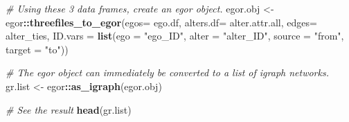 \documentclass[
]{book}
\newenvironment{Shaded}{\begin{snugshade}}{\end{snugshade}}
\newcommand{\AttributeTok}[1]{\textcolor[rgb]{0.13,0.29,0.53}{#1}}
\newcommand{\CommentTok}[1]{\textcolor[rgb]{0.56,0.35,0.01}{\textit{#1}}}
\newcommand{\FunctionTok}[1]{\textcolor[rgb]{0.13,0.29,0.53}{\textbf{#1}}}
\newcommand{\NormalTok}[1]{#1}
\newcommand{\OtherTok}[1]{\textcolor[rgb]{0.56,0.35,0.01}{#1}}
\newcommand{\SpecialCharTok}[1]{\textcolor[rgb]{0.81,0.36,0.00}{\textbf{#1}}}
\newcommand{\StringTok}[1]{\textcolor[rgb]{0.31,0.60,0.02}{#1}}
\begin{document}
\begin{Shaded}
\begin{Highlighting}[]
\CommentTok{\# Using these 3 data frames, create an egor object.}
\NormalTok{egor.obj }\OtherTok{\textless{}{-}}\NormalTok{ egor}\SpecialCharTok{::}\FunctionTok{threefiles\_to\_egor}\NormalTok{(}\AttributeTok{egos=}\NormalTok{ ego.df, }
                               \AttributeTok{alters.df=}\NormalTok{ alter.attr.all, }
                               \AttributeTok{edges=}\NormalTok{ alter\_ties, }
                               \AttributeTok{ID.vars =} \FunctionTok{list}\NormalTok{(}\AttributeTok{ego =} \StringTok{"ego\_ID"}\NormalTok{, }
                                              \AttributeTok{alter =} \StringTok{"alter\_ID"}\NormalTok{, }
                                              \AttributeTok{source =} \StringTok{"from"}\NormalTok{, }
                                              \AttributeTok{target =} \StringTok{"to"}\NormalTok{))}

\CommentTok{\# The egor object can immediately be converted to a list of igraph networks.}
\NormalTok{gr.list }\OtherTok{\textless{}{-}}\NormalTok{ egor}\SpecialCharTok{::}\FunctionTok{as\_igraph}\NormalTok{(egor.obj)}

\CommentTok{\# See the result}
\FunctionTok{head}\NormalTok{(gr.list)}
\end{Highlighting}
\end{Shaded}
\end{document}
